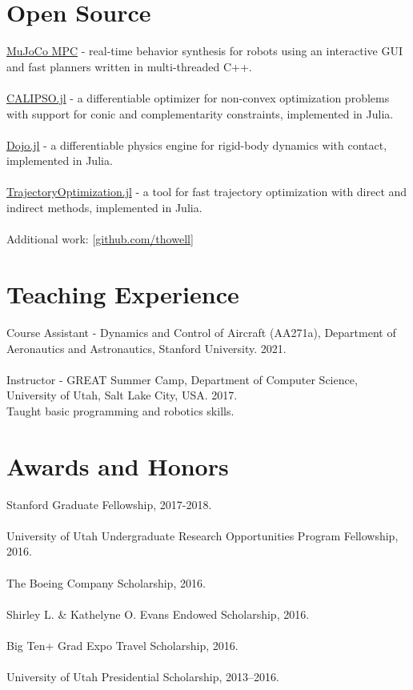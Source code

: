 \documentclass[10pt]{article}
\begin{document}
\section*{Open Source}
\href{https://github.com/deepmind/mujoco_mpc}{MuJoCo MPC} - real-time behavior synthesis for robots using an interactive GUI and fast planners written in multi-threaded C++.
\\
\\
\href{https://github.com/thowell/CALIPSO.jl}{CALIPSO.jl} - a differentiable optimizer for non-convex optimization problems with support for conic and complementarity constraints, implemented in Julia.
\\
\\
\href{https://github.com/dojo-sim/Dojo.jl}{Dojo.jl} - a differentiable physics engine for rigid-body dynamics with contact, implemented in Julia.
\\
\\
\href{https://github.com/RoboticExplorationLab/TrajectoryOptimization.jl}{TrajectoryOptimization.jl} - a tool for fast trajectory optimization with direct and indirect methods, implemented in Julia.
\\
\\
Additional work: [\href{https://github.com/thowell}{github.com/thowell}]

\section*{Teaching Experience}
Course Assistant - Dynamics and Control of Aircraft (AA271a), Department of Aeronautics and Astronautics, Stanford University. 2021.
\\
\\
Instructor - GREAT Summer Camp, Department of Computer Science, University of Utah, Salt Lake City, USA. 2017. \\
Taught basic programming and robotics skills.

\section*{Awards and Honors}
Stanford Graduate Fellowship,  2017-2018.
\\
\\
University of Utah Undergraduate Research Opportunities Program Fellowship, 2016.
\\
\\
The Boeing Company Scholarship, 2016.
\\
\\
Shirley L. \& Kathelyne O. Evans Endowed Scholarship, 2016.
\\
\\
Big Ten+ Grad Expo Travel Scholarship, 2016.
\\
\\
University of Utah Presidential Scholarship, 2013–2016.
\end{document}
